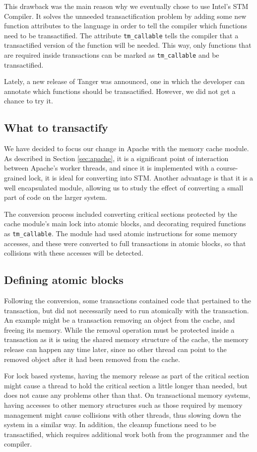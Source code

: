 \documentclass[preprint,11pt]{sigplanconf}
\begin{document}
This drawback was the main reason why we eventually chose to use Intel's STM
Compiler. It solves the unneeded transactification problem by adding some new function attributes
to the language in order to tell the compiler which functions need to be transactified.
The attribute {\tt tm\_callable} tells the compiler that a transactified version
of the function will be needed. This way, only functions that are required inside
transactions can be marked as {\tt tm\_callable} and be transactified.

Lately, a new release of {\sc Tanger} was announced, one in which the developer
can annotate which functions should be transactified. However, we did not get a
chance to try it.

\subsection{What to transactify}
We have decided to focus our change in Apache with the memory cache module. As
described in Section \ref{sec:apache}, it is a significant point of interaction
between Apache's worker threads, and since it is implemented with a course-grained
lock, it is ideal for converting into STM. Another advantage is that it is a
well encapsulated module, allowing us to study the effect of converting a small 
part of code on the larger system.

The conversion process included converting critical sections protected by the
cache module's main lock into atomic blocks, and decorating required functions
as {\tt tm\_callable}. The module had used atomic instructions for some memory
accesses, and these were converted to full transactions in atomic blocks, so
that collisions with these accesses will be detected.

\subsection{Defining atomic blocks}
Following the conversion, some transactions contained code that pertained to
the transaction, but did not necessarily need to run atomically with the
transaction. An example might be a transaction removing an object from the
cache, and freeing its memory. While the removal operation must be protected
inside a transaction as it is using the shared memory structure of the cache,
the memory release can happen any time later, since no other thread can point to
the removed object after it had been removed from the cache. 

For lock based systems, having the memory release as part of the critical
section might cause a thread to hold the critical section a little longer than
needed, but does not cause any problems other than that. On transactional memory
systems, having accesses to other memory structures such as those required by
memory management might cause collisions with other threads, thus slowing down
the system in a similar way. In addition, the cleanup functions need to be
transactified, which requires additional work both from the programmer and the
compiler.
\end{document}
